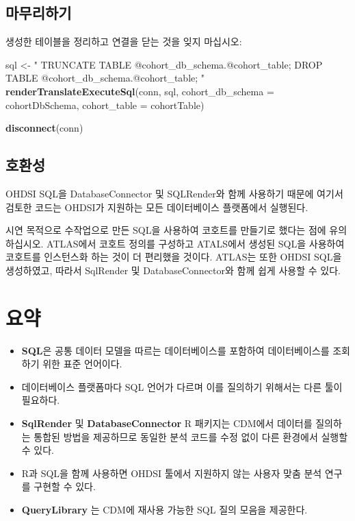 \documentclass[10.5pt]{book}
\newenvironment{Shaded}{\begin{snugshade}}{\end{snugshade}}
\newcommand{\KeywordTok}[1]{\textcolor[rgb]{0.13,0.29,0.53}{\textbf{#1}}}
\newcommand{\DataTypeTok}[1]{\textcolor[rgb]{0.13,0.29,0.53}{#1}}
\newcommand{\StringTok}[1]{\textcolor[rgb]{0.31,0.60,0.02}{#1}}
\newcommand{\NormalTok}[1]{#1}
\theoremstyle{definition}
\theoremstyle{definition}
\theoremstyle{definition}
\theoremstyle{remark}
\let\BeginKnitrBlock\begin \let\EndKnitrBlock\end
\begin{document}
\subsection{마무리하기}

생성한 테이블을 정리하고 연결을 닫는 것을 잊지 마십시오:

\begin{Shaded}
\begin{Highlighting}[]
\NormalTok{sql <-}\StringTok{ "}
\StringTok{TRUNCATE TABLE @cohort_db_schema.@cohort_table;}
\StringTok{DROP TABLE @cohort_db_schema.@cohort_table;}
\StringTok{"}
\KeywordTok{renderTranslateExecuteSql}\NormalTok{(conn, sql,}
                          \DataTypeTok{cohort_db_schema =}\NormalTok{ cohortDbSchema,}
                          \DataTypeTok{cohort_table =}\NormalTok{ cohortTable)}

\KeywordTok{disconnect}\NormalTok{(conn)}
\end{Highlighting}
\end{Shaded}

\subsection{호환성}

OHDSI SQL을 DatabaseConnector 및 SQLRender와 함께 사용하기 때문에 여기서
검토한 코드는 OHDSI가 지원하는 모든 데이터베이스 플랫폼에서 실행된다.

시연 목적으로 수작업으로 만든 SQL을 사용하여 코호트를 만들기로 했다는
점에 유의하십시오. ATLAS에서 코호트 정의를 구성하고 ATALS에서 생성된
SQL을 사용하여 코호트를 인스턴스화 하는 것이 더 편리했을 것이다. ATLAS는
또한 OHDSI SQL을 생성하였고, 따라서 SqlRender 및 DatabaseConnector와
함께 쉽게 사용할 수 있다.

\section{요약}\label{-7}

\BeginKnitrBlock{rmdsummary}
\begin{itemize}
\item
  \textbf{SQL}은 공통 데이터 모델을 따르는 데이터베이스를 포함하여
  데이터베이스를 조회하기 위한 표준 언어이다.
\item
  데이터베이스 플랫폼마다 SQL 언어가 다르며 이를 질의하기 위해서는 다른
  툴이 필요하다.
\item
  \textbf{SqlRender} 및 \textbf{DatabaseConnector} R 패키지는 CDM에서
  데이터를 질의하는 통합된 방법을 제공하므로 동일한 분석 코드를 수정
  없이 다른 환경에서 실행할 수 있다.
\item
  R과 SQL을 함께 사용하면 OHDSI 툴에서 지원하지 않는 사용자 맞춤 분석
  연구를 구현할 수 있다.
\item
  \textbf{QueryLibrary} 는 CDM에 재사용 가능한 SQL 질의 모음을 제공한다.
\end{itemize}
\EndKnitrBlock{rmdsummary}
\end{document}
